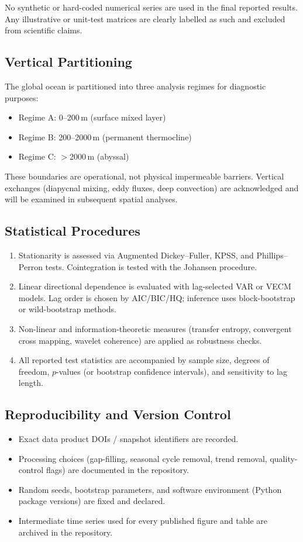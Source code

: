 \documentclass[11pt,a4paper]{article}
\begin{document}
No synthetic or hard-coded numerical series are used in the final reported results. Any illustrative or unit-test matrices are clearly labelled as such and excluded from scientific claims.

\subsection{Vertical Partitioning}
The global ocean is partitioned into three analysis regimes for diagnostic purposes:
\begin{itemize}
    \item Regime A: 0--200\,m (surface mixed layer)
    \item Regime B: 200--2000\,m (permanent thermocline)
    \item Regime C: $>$2000\,m (abyssal)
\end{itemize}
These boundaries are operational, not physical impermeable barriers. Vertical exchanges (diapycnal mixing, eddy fluxes, deep convection) are acknowledged and will be examined in subsequent spatial analyses.

\subsection{Statistical Procedures}
\begin{enumerate}
    \item Stationarity is assessed via Augmented Dickey--Fuller, KPSS, and Phillips--Perron tests. Cointegration is tested with the Johansen procedure.
    \item Linear directional dependence is evaluated with lag-selected VAR or VECM models. Lag order is chosen by AIC/BIC/HQ; inference uses block-bootstrap or wild-bootstrap methods.
    \item Non-linear and information-theoretic measures (transfer entropy, convergent cross mapping, wavelet coherence) are applied as robustness checks.
    \item All reported test statistics are accompanied by sample size, degrees of freedom, $p$-values (or bootstrap confidence intervals), and sensitivity to lag length.
\end{enumerate}

\subsection{Reproducibility and Version Control}
\begin{itemize}
    \item Exact data product DOIs / snapshot identifiers are recorded.
    \item Processing choices (gap-filling, seasonal cycle removal, trend removal, quality-control flags) are documented in the repository.
    \item Random seeds, bootstrap parameters, and software environment (Python package versions) are fixed and declared.
    \item Intermediate time series used for every published figure and table are archived in the repository.
\end{itemize}
\end{document}
